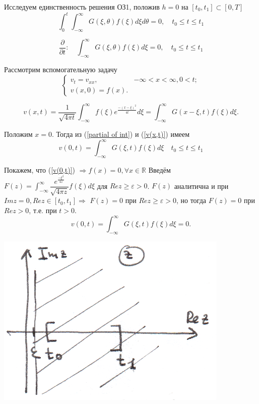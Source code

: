 \documentclass{article}
\begin{document}
Исследуем единственность решения ОЗ1, положив $h=0$ на $[t_0,t_1] \subset [0,T]$
\begin{equation*}
	\int_0^t \int_{-\infty}^{\infty} G(\xi, \theta) f(\xi) d\xi d \theta = 0,
 	\quad t_0 \leqslant t \leqslant t_1
\end{equation*}

\begin{equation}
	\dfrac{\partial}{\partial t}: \quad
	\int_{-\infty}^{\infty} G(\xi, \theta) f(\xi) d\xi = 0,
 	\quad t_0 \leqslant t \leqslant t_1
	\label{partial of int}
\end{equation}

Рассмотрим вспомогательную задачу
\begin{equation*}
\begin{cases}
	v_t = v_{xx}, & -\infty < x < \infty, 0 < t;\\
	v(x,0) = f(x).
\end{cases}
\end{equation*}

\begin{equation}
	v(x,t) = \dfrac{1}{\sqrt{4 \pi t}} \int_{-\infty}^{\infty} f(\xi) e^{\frac{-(x-\xi)^2}{4t}} d\xi = 
	\int_{-\infty}^{\infty} G(x-\xi, t) f(\xi) d\xi.
	\label{v(x,t)}
\end{equation}

Положим $x = 0$. Тогда из (\ref{partial of int}) и (\ref{v(x,t)}) имеем
\begin{equation}
	v(0,t) = \int_{-\infty}^{\infty} G(\xi, t) f(\xi) d\xi
 	\quad t_0 \leqslant t \leqslant t_1
 	\label{v(0,t)}
\end{equation}

Покажем, что (\ref{v(0,t)}) $\Rightarrow f(x) = 0, \forall x \in \mathbb{R}$
Введём $F(z) = \int_{-\infty}^{\infty} \dfrac{e^{\frac{-\xi^2}{4z}}}{\sqrt{4 \pi z}} f(\xi) d\xi$ для $Re z \geqslant \varepsilon > 0$.
 $F(z)$ аналитична и  при $Im z = 0, Re z \in [t_0,t_1] \Rightarrow$ $F(z) = 0$ при $Re z \geqslant \varepsilon > 0$, но тогда $F(z) = 0$ при $Re z > 0$, т.е. при $t>0$.
\begin{equation*}
	v(0,t) = \int_{-\infty}^{\infty} G(\xi, t) f(\xi) d\xi = 0.
\end{equation*}
 
\vspace{0.2cm}
\includegraphics[scale=0.85]{pic4_1.png}
\vspace{0.2cm}
\end{document}

